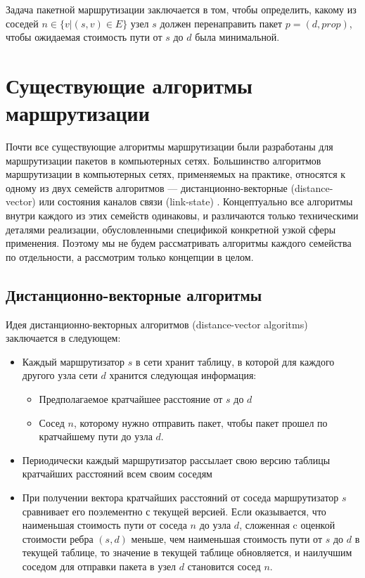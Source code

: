 \documentclass[specification, annotation]{itmo-student-thesis}
\begin{document}
Задача пакетной маршрутизации заключается в том, чтобы определить, какому из
соседей $n \in \{v | (s, v) \in E\}$ узел $s$ должен перенаправить пакет
$p = (d, prop)$, чтобы ожидаемая стоимость пути от $s$ до $d$ была минимальной.

\section{Существующие алгоритмы маршрутизации}

Почти все существующие алгоритмы маршрутизации были разработаны для
маршрутизации пакетов в компьютерных сетях. Большинство алгоритмов маршрутизации
в компьютерных сетях, применяемых на практике, относятся к одному из двух
семейств алгоритмов --- дистанционно-векторные (distance-vector) \cite{arpanet-orig} или
состояния каналов связи (link-state) \cite{link-state-arpanet}.
Концептуально все алгоритмы внутри каждого из этих семейств одинаковы, и различаются только
техническими деталями реализации, обусловленными спецификой конкретной узкой
сферы применения. Поэтому мы не будем рассматривать алгоритмы каждого семейства
по отдельности, а рассмотрим только концепции в целом.

\subsection{Дистанционно-векторные алгоритмы}

Идея дистанционно-векторных алгоритмов (distance-vector algoritms) заключается в
следующем:

\begin{itemize}
\item Каждый маршрутизатор $s$ в сети хранит таблицу, в которой для каждого другого узла
  сети $d$ хранится следующая информация:
  \begin{itemize}
  \item Предполагаемое кратчайшее расстояние от $s$ до $d$
  \item Сосед $n$, которому нужно отправить пакет, чтобы пакет прошел по
    кратчайшему пути до узла $d$.
  \end{itemize}
\item Периодически каждый маршрутизатор рассылает свою версию таблицы кратчайших
  расстояний всем своим соседям
\item При получении вектора кратчайших расстояний от соседа маршрутизатор $s$
  сравнивает его поэлементно с текущей версией. Если оказывается, что наименьшая
  стоимость пути от соседа $n$ до узла $d$, сложенная c оценкой стоимости ребра
  $(s, d)$ меньше, чем наименьшая стоимость пути от $s$ до $d$ в текущей
  таблице, то значение в текущей таблице обновляется, и наилучшим соседом для
  отправки пакета в узел $d$ становится сосед $n$.
\end{itemize}
\end{document}
